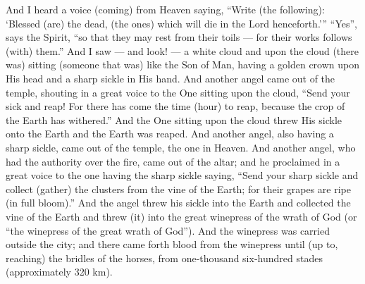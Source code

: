 \begin{pages}
\begin{Leftside}
		\pend
		\pstart
		And I heard a voice (coming) from Heaven saying, “Write (the following): ‘Blessed (are) the dead, (the ones) which will die in the Lord henceforth.’” “Yes”, says the Spirit, “so that they may rest from their toils — for their works follows (with) them.”
		\pend
		\pstart
		And I saw — and look! — a white cloud and upon the cloud (there was) sitting (someone that was) like the Son of Man, having a golden crown upon His head and a sharp sickle in His hand. And another angel came out of the temple, shouting in a great voice to the One sitting upon the cloud, “Send your sick and reap! For there has come the time (hour) to reap, because the crop of the Earth has withered.” And the One sitting upon the cloud threw His sickle onto the Earth and the Earth was reaped. 
		\pend
		\pstart
		And another angel, also having a sharp sickle, came out of the temple, the one in Heaven. And another angel, who had the authority over the fire, came out of the altar; and he proclaimed in a great voice to the one having the sharp sickle saying, “Send your sharp sickle and collect (gather) the clusters from the vine of the Earth; for their grapes are ripe (in full bloom).”
		\pend
		\pstart
		And the angel threw his sickle into the Earth and collected the vine of the Earth and threw (it) into the great winepress of the wrath of God (or “the winepress of the great wrath of God”). And the winepress was carried outside the city; and there came forth blood from the winepress until (up to, reaching) the bridles of the horses, from one-thousand six-hundred stades (approximately 320 km). 
		\pend
        \endnumbering
    \end{Leftside}

\end{pages} 
\Pages

